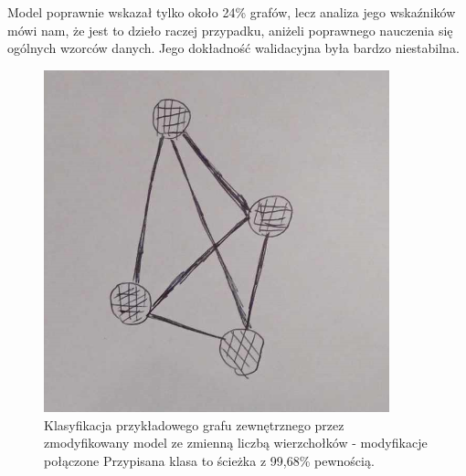 Model poprawnie wskazał tylko około 24\% grafów, lecz analiza jego wskaźników mówi nam,
że jest to dzieło raczej przypadku, aniżeli poprawnego nauczenia się ogólnych wzorców danych.
Jego dokładność walidacyjna była bardzo niestabilna.

\begin{figure}[ht]
	\centering
	\includegraphics[width=10cm]{../graph_classification/test_graphs/drawn/full-3.png}
	\caption{Klasyfikacja przykładowego grafu zewnętrznego przez zmodyfikowany model ze zmienną liczbą wierzchołków - modyfikacje połączone
		Przypisana klasa to ścieżka z 99,68\% pewnością.}
	\label{Fig:tests-cv-2d}
\end{figure}
\FloatBarrier